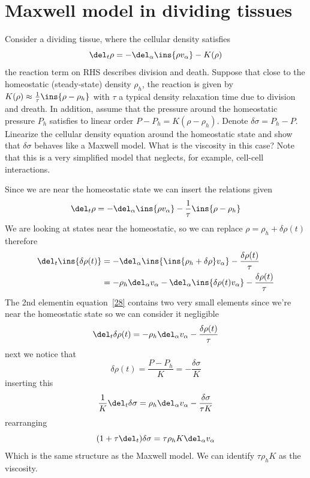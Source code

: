 \clearpage
\section{Maxwell model in dividing tissues}
\begin{colbox}
    Consider a dividing tissue, where the cellular density satisfies
    \begin{equation}
        \del_t\rho = -\del_\alpha\ins{\rho v_\alpha} - K(\rho)
    \end{equation}
    the reaction term on RHS describes division and death. Suppose that close to the homeostatic (steady-state) density \(\rho_h\), the reaction is given by \(K(\rho)\approx\frac{1}{\tau}\ins{\rho-\rho_h}\) with \(\tau\) a typical density relaxation time due to division and dreath. In addition, assume that the pressure around the homeostatic pressure \(P_h\) satisfies to linear order \(P-P_h=K(\rho-\rho_h)\). Denote \(\delta\sigma = P_h-P\). Linearize the cellular density equation around the homeostatic state and show that \(\delta\sigma\) behaves like a Maxwell model. What is the viscosity in this case? Note that this is a very simplified model that neglects, for example, cell-cell interactions.
\end{colbox}
Since we are near the homeostatic state we can insert the relations given
\begin{equation}
    \del_t\rho = -\del_\alpha\ins{\rho v_\alpha} - \frac{1}{\tau}\ins{\rho-\rho_h}
\end{equation}
We are looking at states near the homeostatic, so we can replace \(\rho = \rho_h +\delta\rho(t)\) therefore
\begin{align}
    \del_t\ins{\delta\rho(t)} &= -\del_\alpha \ins{\ins{\rho_h+\delta\rho}v_\alpha}-\frac{\delta\rho(t)}{\tau} \\
    &= -\rho_h\del_\alpha v_\alpha - \del_\alpha\ins{\delta\rho(t) v_\alpha}-\frac{\delta\rho(t)}{\tau} \label{28}
\end{align}
The 2nd elementin equation~\ref{28} contains two very small elements since we're near the homeostatic state so we can consider it negligible
\begin{equation}
    \del_t\delta\rho(t) = -\rho_h\del_\alpha v_\alpha - \frac{\delta\rho(t)}{\tau}
\end{equation}
next we notice that
\begin{equation}
    \delta\rho(t) = \frac{P-P_h}{K} = -\frac{\delta\sigma}{K}
\end{equation}
inserting this
\begin{equation}
    \frac{1}{K}\del_t\delta\sigma = \rho_h \del_\alpha v_\alpha - \frac{\delta\sigma}{\tau K}
\end{equation}
rearranging
\begin{equation}
    (1+\tau\del_t)\delta\sigma = \tau\rho_h K\del_\alpha v_\alpha
\end{equation}
Which is the same structure as the Maxwell model. We can identify \(\tau\rho_h K\) as the viscosity.